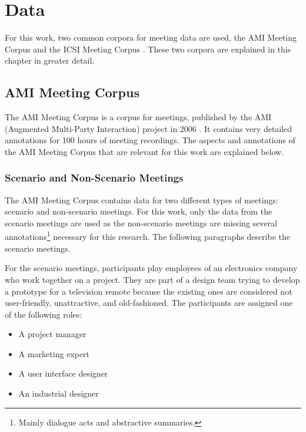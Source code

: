 \chapter{Data}\label{ch:data}

For this work, two common corpora for meeting data are used, the AMI Meeting Corpus \cite{Mccowan05theami} and the ICSI Meeting Corpus \cite{Janin}.
These two corpora are explained in this chapter in greater detail.


\section{AMI Meeting Corpus}\label{sec:ami-meeting-corpus}

The AMI Meeting Corpus is a corpus for meetings, published by the AMI (Augmented Multi-Party Interaction) project in 2006 \cite{Mccowan05theami}.
It contains very detailed annotations for 100 hours of meeting recordings.
The aspects and annotations of the AMI Meeting Corpus that are relevant for this work are explained below.

\subsection{Scenario and Non-Scenario Meetings}

The AMI Meeting Corpus contains data for two different types of meetings: scenario and non-scenario meetings.
For this work, only the data from the scenario meetings are used as the non-scenario meetings are missing several annotations\footnote{Mainly dialogue acts and abstractive summaries.} necessary for this research.
The following paragraphs describe the scenario meetings.

For the scenario meetings, participants play employees of an electronics company who work together on a project.
They are part of a design team trying to develop a prototype for a television remote because the existing ones are considered not user-friendly, unattractive, and old-fashioned.
The participants are assigned one of the following roles:
\begin{itemize}
\item A project manager
\item A marketing expert
\item A user interface designer
\item An industrial designer
\end{itemize}

